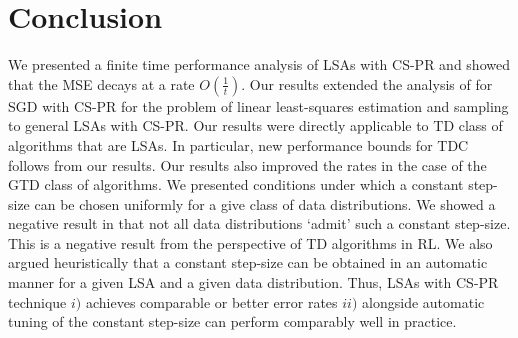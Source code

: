 \section{Conclusion}
We presented a finite time performance analysis of LSAs with CS-PR and showed that the MSE decays at a rate $O(\frac{1}{t})$. Our results extended the analysis of \citet{bach} for SGD with CS-PR for the problem of linear least-squares estimation and \iid sampling to general LSAs with CS-PR. Our results were directly applicable to TD class of algorithms that are LSAs. In particular, new performance bounds for TDC follows from our results. Our results also improved the rates in the case of the GTD class of algorithms. We presented conditions under which a constant step-size can be chosen uniformly for a give class of data distributions. We showed a negative result in that not all data distributions `admit' such a constant step-size. This is a negative result from the perspective of TD algorithms in RL. We also argued heuristically that a constant step-size can be obtained in an automatic manner for a given LSA and a given data distribution. Thus, LSAs with CS-PR technique $i)$ achieves comparable or better error rates $ii)$ alongside automatic tuning of the constant step-size can perform comparably well in practice.
